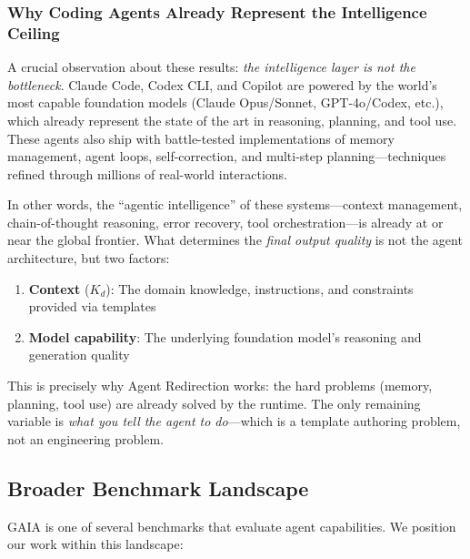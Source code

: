 \subsubsection{Why Coding Agents Already Represent the Intelligence Ceiling}

A crucial observation about these results: \textit{the intelligence layer is not the bottleneck}. Claude Code, Codex CLI, and Copilot are powered by the world's most capable foundation models (Claude Opus/Sonnet, GPT-4o/Codex, etc.), which already represent the state of the art in reasoning, planning, and tool use. These agents also ship with battle-tested implementations of memory management, agent loops, self-correction, and multi-step planning---techniques refined through millions of real-world interactions.

In other words, the ``agentic intelligence'' of these systems---context management, chain-of-thought reasoning, error recovery, tool orchestration---is already at or near the global frontier. What determines the \textit{final output quality} is not the agent architecture, but two factors:

\begin{enumerate}[nosep]
\item \textbf{Context} ($K_d$): The domain knowledge, instructions, and constraints provided via templates
\item \textbf{Model capability}: The underlying foundation model's reasoning and generation quality
\end{enumerate}

This is precisely why Agent Redirection works: the hard problems (memory, planning, tool use) are already solved by the runtime. The only remaining variable is \textit{what you tell the agent to do}---which is a template authoring problem, not an engineering problem.

\subsection{Broader Benchmark Landscape}

GAIA is one of several benchmarks that evaluate agent capabilities. We position our work within this landscape:

